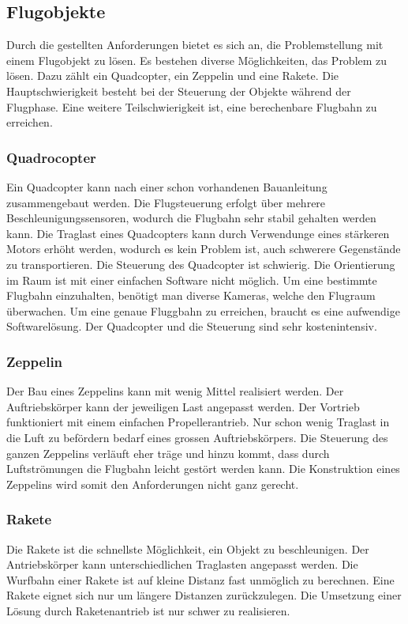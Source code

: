 \subsection{Flugobjekte}
Durch die gestellten Anforderungen bietet es sich an, die Problemstellung mit einem Flugobjekt zu lösen. Es bestehen diverse Möglichkeiten, das Problem zu lösen. Dazu zählt ein Quadcopter, ein Zeppelin und eine Rakete. Die Hauptschwierigkeit besteht bei der Steuerung der Objekte während der Flugphase. Eine weitere Teilschwierigkeit ist, eine berechenbare Flugbahn zu erreichen. 

\subsubsection{Quadrocopter}
Ein Quadcopter kann nach einer schon vorhandenen Bauanleitung zusammengebaut werden. Die Flugsteuerung erfolgt über mehrere Beschleunigungssensoren, wodurch die Flugbahn sehr stabil gehalten werden kann. Die Traglast eines Quadcopters kann durch Verwendunge eines stärkeren Motors erhöht werden, wodurch es kein Problem ist, auch schwerere Gegenstände zu transportieren. Die Steuerung des Quadcopter ist schwierig. Die Orientierung im Raum ist mit einer einfachen Software nicht möglich. Um eine bestimmte Flugbahn einzuhalten, benötigt man diverse Kameras, welche den Flugraum überwachen. Um eine genaue Fluggbahn zu erreichen, braucht es eine aufwendige Softwarelösung. Der Quadcopter und die Steuerung sind sehr kostenintensiv.

\subsubsection{Zeppelin}
Der Bau eines Zeppelins kann mit wenig Mittel realisiert werden. Der Auftriebskörper kann der jeweiligen Last angepasst werden. Der Vortrieb funktioniert mit einem einfachen Propellerantrieb. Nur schon wenig Traglast in die Luft zu befördern bedarf eines grossen Auftriebskörpers. Die Steuerung des ganzen Zeppelins verläuft eher träge und hinzu kommt, dass durch Luftströmungen die Flugbahn leicht gestört werden kann. Die Konstruktion eines Zeppelins wird somit den Anforderungen nicht ganz gerecht.

\subsubsection{Rakete}
Die Rakete ist die schnellste Möglichkeit, ein Objekt zu beschleunigen. Der Antriebskörper kann unterschiedlichen Traglasten angepasst werden. Die Wurfbahn einer Rakete ist auf kleine Distanz fast unmöglich zu berechnen. Eine Rakete eignet sich nur um längere Distanzen zurückzulegen. Die Umsetzung einer Lösung durch Raketenantrieb ist nur schwer zu realisieren.
